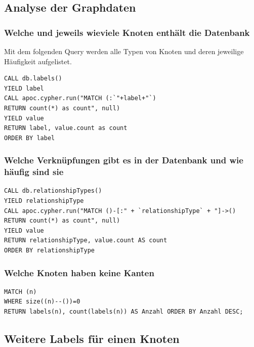 \documentclass[12pt,ngerman,]{article}
\begin{document}
\subsection{Analyse der Graphdaten}\label{analyse-der-graphdaten}

\subsubsection{Welche und jeweils wieviele Knoten enthält die
Datenbank}\label{welche-und-jeweils-wieviele-knoten-enthuxe4lt-die-datenbank}

Mit dem folgenden Query werden alle Typen von Knoten und deren jeweilige
Häufigkeit aufgelistet.

\begin{verbatim}
CALL db.labels()
YIELD label
CALL apoc.cypher.run("MATCH (:`"+label+"`)
RETURN count(*) as count", null)
YIELD value
RETURN label, value.count as count
ORDER BY label
\end{verbatim}

\subsubsection{Welche Verknüpfungen gibt es in der Datenbank und wie
häufig sind
sie}\label{welche-verknuxfcpfungen-gibt-es-in-der-datenbank-und-wie-huxe4ufig-sind-sie}

\begin{verbatim}
CALL db.relationshipTypes()
YIELD relationshipType
CALL apoc.cypher.run("MATCH ()-[:" + `relationshipType` + "]->()
RETURN count(*) as count", null)
YIELD value
RETURN relationshipType, value.count AS count
ORDER BY relationshipType
\end{verbatim}

\subsubsection{Welche Knoten haben keine
Kanten}\label{welche-knoten-haben-keine-kanten}

\begin{verbatim}
MATCH (n)
WHERE size((n)--())=0
RETURN labels(n), count(labels(n)) AS Anzahl ORDER BY Anzahl DESC;
\end{verbatim}

\subsection{Weitere Labels für einen
Knoten}\label{weitere-labels-fuxfcr-einen-knoten}
\end{document}
